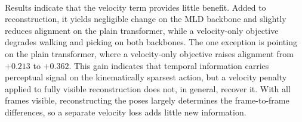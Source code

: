 \documentclass[letterpaper]{article} %
\begin{document}
\begin{table}[htbp]
\centering
\setlength{\tabcolsep}{4pt}
\small
\caption{Alignment (Spearman $\rho$) by training objective ($n=25$, mean $\pm$ SE).
Bold: best (highest mean) in each column.}
~\label{tab:velLoss}
\end{table}

Results indicate that the velocity term provides little benefit. Added to reconstruction, it yields negligible change on the
MLD backbone and slightly reduces alignment on the plain transformer, while a velocity-only objective
degrades walking and picking on both backbones. The one exception is pointing on the plain transformer, where a velocity-only objective raises alignment from $+0.213$ to $+0.362$. This gain indicates that temporal information carries perceptual signal on the kinematically sparsest action, but a velocity penalty applied to fully visible reconstruction does not, in general, recover it.  With all frames visible, reconstructing the poses largely determines the frame-to-frame differences, so a separate velocity loss adds little new information. 
\end{document}

